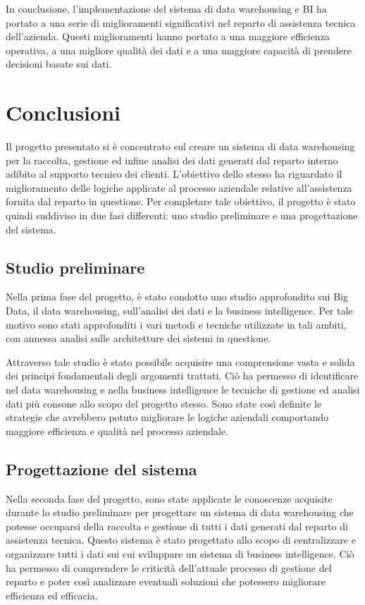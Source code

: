 In conclusione, l'implementazione del sistema di data warehousing e BI ha portato a una serie di miglioramenti significativi nel reparto di assistenza tecnica dell'azienda. Questi miglioramenti hanno portato a una maggiore efficienza operativa, a una migliore qualità dei dati e a una maggiore capacità di prendere decisioni basate sui dati.

\section{Conclusioni}

Il progetto presentato si è concentrato sul creare un sistema di data warehousing per la raccolta, gestione ed infine analisi dei dati generati dal reparto interno adibito al supporto tecnico dei clienti. L'obiettivo dello stesso ha riguardato il miglioramento delle logiche applicate al processo aziendale relative all'assistenza fornita dal reparto in questione. Per completare tale obiettivo, il progetto è stato quindi suddiviso in due fasi differenti: uno studio preliminare e una progettazione del sistema.

\subsection{Studio preliminare}

Nella prima fase del progetto, è stato condotto uno studio approfondito sui Big Data, il data warehousing, sull'analisi dei dati e la business intelligence. Per tale motivo sono stati approfonditi i vari metodi e tecniche utilizzate in tali ambiti, con annessa analisi sulle architetture dei sistemi in questione.

Attraverso tale studio è stato possibile acquisire una comprensione vasta e solida dei principi fondamentali degli argomenti trattati. Ciò ha permesso di identificare nel data warehousing e nella business intelligence le tecniche di gestione ed analisi dati più consone allo scopo del progetto stesso. Sono state così definite le strategie che avrebbero potuto migliorare le logiche aziendali comportando maggiore efficienza e qualità nel processo aziendale. 

\subsection{Progettazione del sistema}

Nella seconda fase del progetto, sono state applicate le conoscenze acquisite durante lo studio preliminare per progettare un sistema di data warehousing che potesse occuparsi della raccolta e gestione di tutti i dati generati dal reparto di assistenza tecnica. Questo sistema è stato progettato allo scopo di centralizzare e organizzare tutti i dati sui cui sviluppare un sistema di business intelligence. Ciò ha permesso di comprendere le criticità dell'attuale processo di gestione del reparto e poter così analizzare eventuali soluzioni che potessero migliorare efficienza ed efficacia.

